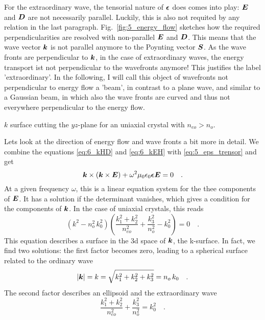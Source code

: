 For the extraordinary wave, the tensorial nature of $\boldsymbol{\epsilon}$ does  comes into play: $\boldsymbol{E}$ and $\boldsymbol{D}$ are not necessarily parallel. Luckily, this is also not  requited by any relation in the last paragraph. Fig.~\ref{fig:5_energy_flow} sketches how the required perpendicularities are resolved with non-parallel  $\boldsymbol{E}$ and $\boldsymbol{D}$. This means that the wave vector $\boldsymbol{k}$ is not parallel anymore to the Poynting vector $\boldsymbol{S}$. As the wave fronts are perpendicular to $\boldsymbol{k}$, in the case of extraordinary waves, the energy transport ist not perpendicular to the wavefronts anymore! This justifies the label 'extraordinary'. In the following, I will call this object of wavefronts not perpendicular to energy flow a 'beam', in contrast to a plane wave, and similar to a Gaussian beam, in which also the wave fronts are curved and thus not everywhere perpendicular to the energy flow.

\begin{marginfigure}
    \caption{$k$ surface cutting the $yz$-plane for an uniaxial crystal with $n_{eo}  > n_o$.}
\end{marginfigure}

Lets look at the direction of energy flow and wave fronts a bit more in detail. We combine the  equations  \ref{eq:6_kHD} and  \ref{eq:6_kEH} with \ref{eq:5_eps_trensor} and get
\begin{equation}
    \boldsymbol{k} \times ( \boldsymbol{k} \times \boldsymbol{E}) + \omega^2 \mu_0 \epsilon_0 \boldsymbol{\epsilon} \boldsymbol{E} = 0 \quad .
\end{equation}
At a given frequency $\omega$, this is a linear equation system for the thee components of $\boldsymbol{E}$. It has a solution if the determinant vanishes, which gives a condition for the components of $\boldsymbol{k}$. In the case of uniaxial crystals, this reads
\begin{equation}
    (k^2 - n_o^2 \, k_0^2) \left( \frac{k_1^2 + k_2^2}{n_{eo}^2} + \frac{k_3^2}{n_o^2} - k_0^2  \right) = 0 \quad .
\end{equation}
This equation describes a surface in the 3d space of $\boldsymbol{k}$, the k-surface. In fact, we find two solutions: the first factor becomes zero, leading to a spherical surface related to  the ordinary wave 
\begin{equation}
    | \boldsymbol{k}| = k  = \sqrt{k_1^2 + k_2^2 + k_3^2} = n_o \, k_0 \quad .
\end{equation}
The second factor describes an ellipsoid and the extraordinary wave
\begin{equation}
    \frac{k_1^2 + k_2^2}{n_{eo}^2} + \frac{k_3^2}{n_o^2} = k_0^2  \quad .
\end{equation}



